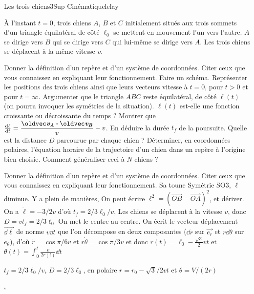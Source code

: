 \begin{exercise}{Les trois chiens}{3}{Sup}
{Cinématique}{lelay}

À l'instant $t = 0$, trois chiens $A$, $B$ et $C$ initialement situés aux trois sommets d'un triangle équilatéral de côté $\ell_0$ se mettent en mouvement l'un vers l'autre. $A$ se dirige vers $B$ qui se dirige vers $C$ qui lui-même se dirige vers $A$. Les trois chiens se déplacent à la même vitesse $v$.
\begin{questions}
    \questioncours Donner la définition d'un repère et d'un système de coordonnées. Citer ceux que vous connaissez en expliquant leur fonctionnement.
    \question Faire un schéma. Représenter les positions des trois chiens ainsi que leurs vecteurs vitesse à $t = 0$, pour $t > 0$ et pour $t = \infty$.
    \question Argumenter que le triangle $ABC$ reste équilatéral, de côté $\ell(t)$ (on pourra invoquer les symétries de la situation). $\ell(t)$ est-elle une fonction croissante ou décroissante du temps ?
    \question Montrer que $\dv{\ell}{t} = \dfrac{\vec{v_A} \vdot \vec{v_B}}{v} - v$. 
    \question En déduire la durée $t_f$ de la poursuite.
    \question Quelle est la distance $D$ parcourue par chaque chien ?
    \question Déterminer, en coordonnées polaires, l'équation horaire de la trajectoire d'un chien dans un repère à l'origine bien choisie.
    \questionbonus Comment généraliser ceci à $N$ chiens ?
\end{questions}

\end{exercise}

\begin{solution}
\begin{questions}
    \questioncours Donner la définition d'un repère et d'un système de coordonnées. Citer ceux que vous connaissez en expliquant leur fonctionnement.
    \question Sa toune
    \question Symétrie SO3, $\ell$ diminue.
    \question Y a plein de manières, On peut écrire $\ell^2 = (\vec{OB} - \vec{OA})^2$, et dériver. 
    \question On a $\dot \ell = -3/2 v$ d'où $t_f = 2/3 \ell_0 / v$, 
    \question Les chiens se déplacent à la vitesse $v$, donc $D = v t_f = 2 / 3 \ell_0$
    \question On met le centre au centre. On écrit le vecteur déplacement $\vec{\dd{\ell}}$ de norme $v \dd{t}$ que l'on décompose en deux composantes ($\dd{r}$ sur $\vec{e_r}$ et $r\dd{\theta}$ sur $e_\theta$), d'où $\dot r = \cos \pi/6 v$ et $r\dot\theta = \cos \pi/3 v$ et donc $r(t) = \ell_0 - \frac{\sqrt{3}}{2} vt$ et $\theta(t) =  \int_0^t \frac{v}{2r(t)}\dd{t}$
\end{questions}



$t_f = 2/3 \ell_0 / v$, $D = 2 / 3 \ell_0$, en polaire $r = r_0 - \sqrt{3}/2 v t$ et $\theta = V/(2r)$
\end{solution}
,
